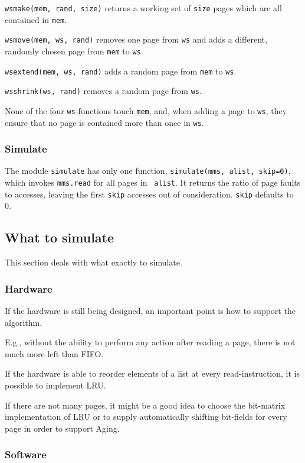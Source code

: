 \documentclass[a4paper,12pt,BCOR2cm,DIV12]{scrartcl}
\begin{document}
{\tt wsmake(mem, rand, size)} returns a working set of {\tt size}
pages which are all contained in {\tt mem}.

{\tt wsmove(mem, ws, rand)} removes one page from {\tt ws} and adds a
different, randomly chosen page from {\tt mem} to {\tt ws}.

{\tt wsextend(mem, ws, rand)} adds a random page from {\tt mem} to
{\tt ws}.

{\tt wsshrink(ws, rand)} removes a random page from {\tt ws}.

None of the four {\tt ws}-functions touch {\tt mem}, and, when adding
a page to {\tt ws}, they ensure that no page is contained more than
once in {\tt ws}.

\subsubsection{Simulate}

The module {\tt simulate} has only one function, {\tt simulate(mms,
alist, skip=0)}, which invokes {\tt mms.read} for all pages in {\tt
alist}.  It returns the ratio of page faults to accesses, leaving the
first {\tt skip} accesses out of consideration.  {\tt skip} defaults
to 0.

\subsection{What to simulate}

This section deals with what exactly to simulate.

\subsubsection{Hardware}

If the hardware is still being designed, an important point is how to
support the algorithm.

E.g., without the ability to perform any action after reading a page,
there is not much more left than FIFO.

If the hardware is able to reorder elements of a list at every
read-instruction, it is possible to implement LRU.

If there are not many pages, it might be a good idea to choose the
bit-matrix implementation of LRU or to supply automatically shifting
bit-fields for every page in order to support Aging.

\subsubsection{Software}
\end{document}
